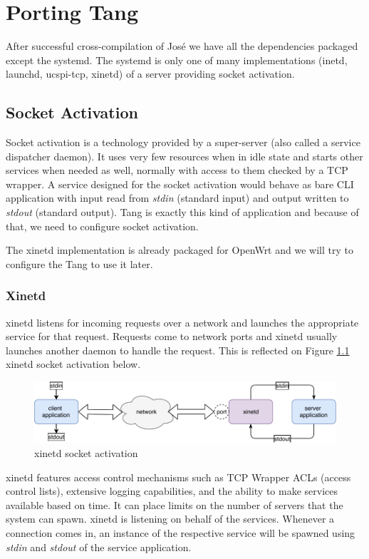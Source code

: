 \chapter{Porting Tang}\label{porting-tang}

After successful cross-compilation of José we have all the dependencies packaged except the systemd.
The systemd is only one of many implementations (inetd, launchd, ucspi-tcp, xinetd) of a server providing socket activation.



\section{Socket Activation}\label{socket_activation}

Socket activation is a technology provided by a super-server (also called a service dispatcher daemon).
It uses very few resources when in idle state and starts other services when needed as well, normally with access to them checked by a TCP wrapper.
A service designed for the socket activation would behave as bare CLI application with input read from {\it stdin} (standard input) and output written to {\it stdout} (standard output).
Tang is exactly this kind of application and because of that, we need to configure socket activation.

The xinetd implementation is already packaged for OpenWrt and we will try to configure the Tang to use it later.



\subsection{Xinetd}
xinetd listens for incoming requests over a network and launches the appropriate service for that request.
Requests come to network ports and xinetd usually launches another daemon to handle the request.
This is reflected on Figure \ref{fig_xinetd} xinetd socket activation below.
\begin{figure}[h]
    \centering
    \includegraphics[scale=0.9]{figures/xinetd.pdf}
    \caption{xinetd socket activation}
    \label{fig_xinetd}
\end{figure}
xinetd features access control mechanisms such as TCP Wrapper ACLs (access control lists), extensive logging capabilities, and the ability to make services available based on time.
It can place limits on the number of servers that the system can spawn.
xinetd is listening on behalf of the services.
Whenever a connection comes in, an instance of the respective service will be spawned using {\it stdin} and {\it stdout} of the service application\cite{xinetd}.


